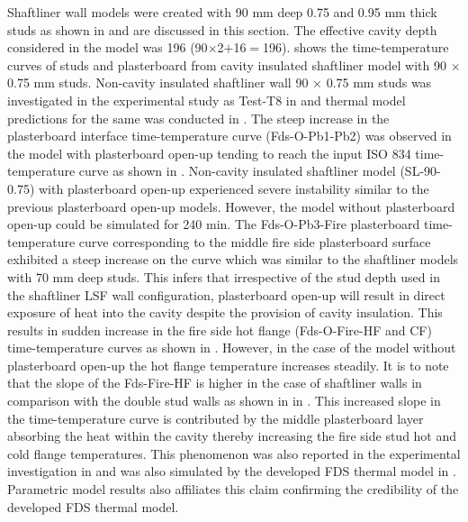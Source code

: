 Shaftliner wall models were created with 90 mm deep 0.75 and 0.95 mm thick studs as shown in  and are discussed in this section. The effective cavity depth considered in the model was 196 (90$\times$2$+$16$=$196).  shows the time-temperature curves of studs and plasterboard from cavity insulated shaftliner model with 90 $\times$ 0.75 mm studs. Non-cavity insulated shaftliner wall 90 $\times$ 0.75 mm studs was investigated in the experimental study as Test-T8 in  and thermal model predictions for the same was conducted in . The steep increase in the plasterboard interface time-temperature curve (Fds-O-Pb1-Pb2) was observed in the model with plasterboard open-up tending to reach the input ISO 834 time-temperature curve as shown in . Non-cavity insulated shaftliner model (SL-90-0.75) with plasterboard open-up experienced severe instability similar to the previous plasterboard open-up models. However, the model without plasterboard open-up could be simulated for 240 min. The Fds-O-Pb3-Fire plasterboard time-temperature curve corresponding to the middle fire side plasterboard surface exhibited a steep increase on the curve which was similar to the shaftliner models with 70 mm deep studs. This infers that irrespective of the stud depth used in the shaftliner LSF wall configuration, plasterboard open-up will result in direct exposure of heat into the cavity despite the provision of cavity insulation. This results in sudden increase in the fire side hot flange (Fds-O-Fire-HF and CF) time-temperature curves as shown in . However, in the case of the model without plasterboard open-up the hot flange temperature increases steadily. It is to note that the slope of the Fds-Fire-HF is higher in the case of shaftliner walls in comparison with the double stud walls as shown in  in . This increased slope in the time-temperature curve is contributed by the middle plasterboard layer absorbing the heat within the cavity thereby increasing the fire side stud hot and cold flange temperatures. This phenomenon was also reported in the experimental investigation in  and was also simulated by the developed FDS thermal model in . Parametric model results also affiliates this claim confirming the credibility of the developed FDS thermal model.  
